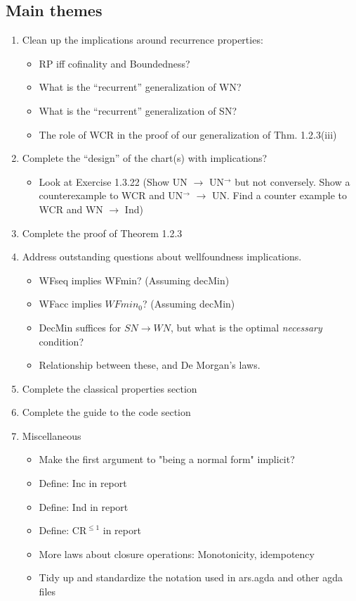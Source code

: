 \documentclass{scrartcl}
\begin{document}
\subsection{Main themes}
\begin{enumerate}
  \item Clean up the implications around recurrence properties:
  \begin{itemize}
    \item RP iff cofinality and Boundedness?
    \item What is the ``recurrent'' generalization of WN?
    \item What is the ``recurrent'' generalization of SN?
    \item The role of WCR in the proof of our generalization of Thm. 1.2.3(iii)
  \end{itemize}
  \item Complete the ``design'' of the chart(s) with implications?
  \begin{itemize}
    \item   Look at Exercise 1.3.22 (Show UN $\to$ UN$^\to$ but not conversely. Show a counterexample to WCR and UN$^\to$ $\to$ UN. Find a counter example to WCR and WN $\to$ Ind)
  \end{itemize}
  \item Complete the proof of Theorem 1.2.3
  \item Address outstanding questions about wellfoundness implications.
  \begin{itemize}
    \item WFseq implies WFmin? (Assuming decMin)
    \item WFacc implies $WFmin_0$? (Assuming decMin)
    \item DecMin suffices for $SN\to WN$, but what is the optimal \emph{necessary} condition?
    \item Relationship between these, and De Morgan's laws.
  \end{itemize}
  \item Complete the classical properties section
  \item Complete the guide to the code section
  \item Miscellaneous
  \begin{itemize}
    \item   Make the first argument to "being a normal form" implicit?
    \item   Define: Inc in report
    \item   Define: Ind in report
    \item   Define: $\mathrm{CR}^{\le 1}$ in report
    \item   More laws about closure operations: Monotonicity, idempotency
    \item   Tidy up and standardize the notation used in ars.agda and other agda files
  \end{itemize}
\end{enumerate}
\end{document}
